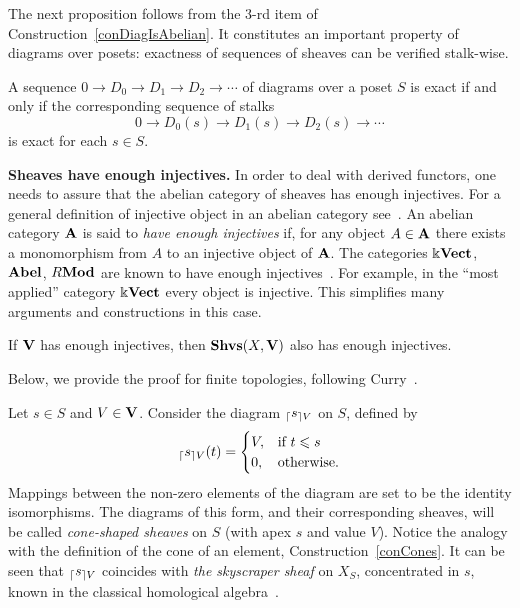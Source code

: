 The next proposition follows from the 3-rd item of Construction~\ref{conDiagIsAbelian}. It constitutes an important property of diagrams over posets: exactness of sequences of sheaves can be verified stalk-wise. 

\begin{prop}\label{propExactSequenceDiagrams}
A sequence $0\to D_0\to D_1\to D_2 \to\cdots$ of diagrams over a poset $S$ is exact if and only if the corresponding sequence of stalks
\[
0\to D_0(s)\to D_1(s)\to D_2(s)\to\cdots
\]
is exact for each $s\in S$.
\end{prop}

\textbf{Sheaves have enough injectives.} In order to deal with derived functors, one needs to assure that the abelian category of sheaves has enough injectives. For a general definition of injective object in an abelian category see~\cite[\S2.3]{weibel1994homalg}. An abelian category $\mathbf{A}$ is said to \emph{have enough injectives} if, for any object $A\in\mathbf{A}$ there exists a monomorphism from $A$ to an injective object of $\mathbf{A}$. The categories $\Bbbk\mathbf{Vect}$, $\mathbf{Abel}$, $R\mathbf{Mod}$ are known to have enough injectives~\cite[\S 2.3]{weibel1994homalg}. For example, in the ``most applied'' category $\Bbbk\mathbf{Vect}$ every object is injective. This simplifies many arguments and constructions in this case.

\begin{prop}\label{propEnoughInjectives}
If $\mathbf{V}$ has enough injectives, then $\mathbf{Shvs}(X,\mathbf{V})$ also has enough injectives.
\end{prop}

Below, we provide the proof for finite topologies, following Curry~\cite[Def.7.1.3]{Curry}.

\begin{con}\label{conInjSheaves}
Let $s\in S$ and $V\in\mathbf{V}$. Consider the diagram ${_{\lceil}s_{\rceil V}}$ on $S$, defined by
\begin{equation}\label{eqDefinElementaryInj}
{_{\lceil}s_{\rceil V}}(t)=\begin{cases}
               V, & \mbox{if } t\leqslant s \\
               0, & \mbox{otherwise}.
             \end{cases}
\end{equation}
Mappings between the non-zero elements of the diagram are set to be the identity isomorphisms. The diagrams of this form, and their corresponding sheaves, will be called \emph{cone-shaped sheaves} on $S$ (with apex $s$ and value $V$). Notice the analogy with the definition of the cone of an element, Construction~\ref{conCones}. It can be seen that ${_{\lceil}s_{\rceil V}}$ coincides with \emph{the skyscraper sheaf} on $X_S$, concentrated in $s$, known in the classical homological algebra~\cite[Ex.2.3.12]{weibel1994homalg}.
\end{con}

